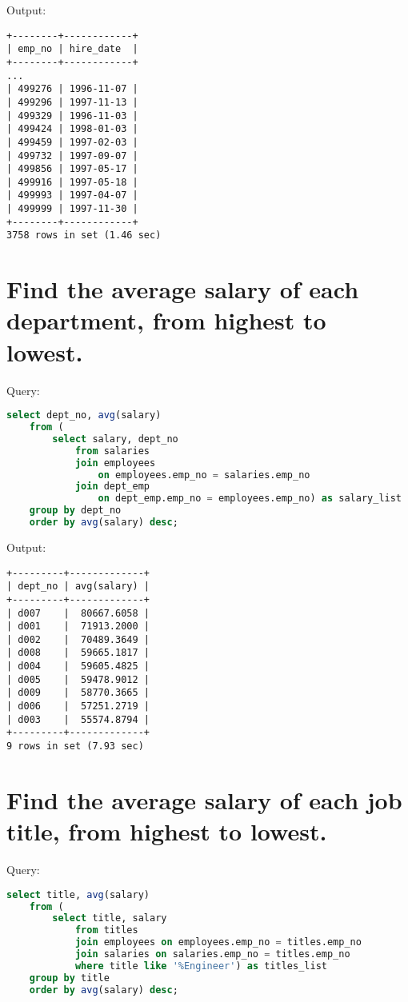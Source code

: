 \documentclass[12pt]{article}
\begin{document}
Output:

\begin{verbatim}
+--------+------------+
| emp_no | hire_date  |
+--------+------------+
...
| 499276 | 1996-11-07 |
| 499296 | 1997-11-13 |
| 499329 | 1996-11-03 |
| 499424 | 1998-01-03 |
| 499459 | 1997-02-03 |
| 499732 | 1997-09-07 |
| 499856 | 1997-05-17 |
| 499916 | 1997-05-18 |
| 499993 | 1997-04-07 |
| 499999 | 1997-11-30 |
+--------+------------+
3758 rows in set (1.46 sec)
\end{verbatim}


\section{Find the average salary of each department, from highest to lowest.}

Query:

\begin{lstlisting}[language=SQL]
select dept_no, avg(salary)
    from (
        select salary, dept_no
            from salaries
            join employees
                on employees.emp_no = salaries.emp_no
            join dept_emp
                on dept_emp.emp_no = employees.emp_no) as salary_list
    group by dept_no
    order by avg(salary) desc;
\end{lstlisting}

Output:

\begin{verbatim}
+---------+-------------+
| dept_no | avg(salary) |
+---------+-------------+
| d007    |  80667.6058 |
| d001    |  71913.2000 |
| d002    |  70489.3649 |
| d008    |  59665.1817 |
| d004    |  59605.4825 |
| d005    |  59478.9012 |
| d009    |  58770.3665 |
| d006    |  57251.2719 |
| d003    |  55574.8794 |
+---------+-------------+
9 rows in set (7.93 sec)
\end{verbatim}


\section{Find the average salary of each job title, from highest to lowest.}

Query:

\begin{lstlisting}[language=SQL]
select title, avg(salary)
    from (
        select title, salary
            from titles
            join employees on employees.emp_no = titles.emp_no
            join salaries on salaries.emp_no = titles.emp_no
            where title like '%Engineer') as titles_list
    group by title
    order by avg(salary) desc;
\end{lstlisting}
\end{document}
